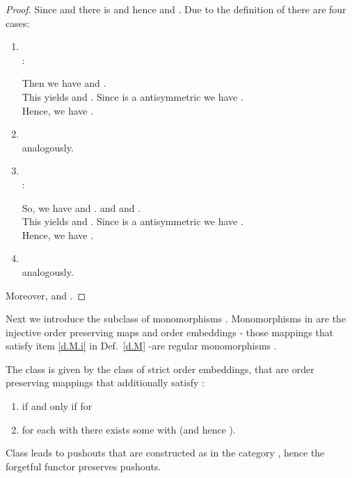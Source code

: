 \begin{proof}
			Since 	 and  there is   and hence  and . Due to the definition of  there are four cases:
			
			\begin{enumerate}
				\item \\
				      :
							
							Then we have 
							and .\\
							This yields
							  and . Since  is a antisymmetric we have .\\
							Hence, we have . \\
					\item \\
				       analogously.\\
					\item \\
				      :
							
							So, we have  and . and 
							    and .\\
This yields
							  and . Since  is a antisymmetric we have .\\
							Hence, we have . \\
					\item \\
				      
							analogously.
			\end{enumerate}
			Moreover,  and 
			.
			
\end{proof}

Next we introduce the subclass of monomorphisms . Monomorphisms in  are the injective order preserving  maps \cite{Cod07} and order embeddings - those mappings that satisfy item \ref{d.M.i} in Def.~\ref{d.M} -are regular monomorphisms \cite{Cod07}.


\begin{definition}[Class ]
\label{d.M}
The class  is given by the class of strict order embeddings,  that are order preserving mappings
 that additionally satisfy :

\begin{enumerate}
	\item \label{d.M.i}  if and only if  for  
	\item \label{d.M.ii} for each  with   there exists some  with  (and hence ).
\end{enumerate}
\end{definition}

Class  leads to pushouts that are constructed as in the category , hence the forgetful functor
 preserves pushouts.


